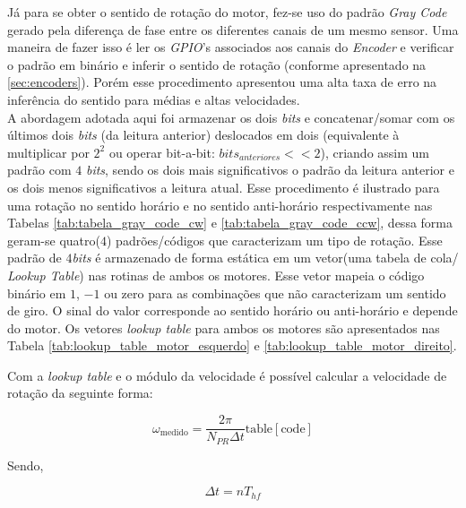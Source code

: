 Já para se obter o sentido de rotação do motor, fez-se uso do padrão \emph{Gray Code} gerado pela diferença de fase entre os diferentes canais de um mesmo sensor. Uma maneira de fazer isso é ler os \emph{GPIO}'s associados aos canais do \emph{Encoder} e verificar o padrão em binário e inferir o sentido de rotação (conforme apresentado na \autoref{sec:encoders}). Porém esse procedimento apresentou uma alta taxa de erro na inferência do sentido para médias e altas velocidades. \\

A abordagem adotada aqui foi armazenar os dois \emph{bits} e concatenar/somar com os últimos dois \emph{bits} (da leitura anterior) deslocados em dois (equivalente à multiplicar por $2^2$ ou operar bit-a-bit: $bits_{anteriores} << 2$), criando assim um padrão com $4$ \emph{bits}, sendo os dois mais significativos o padrão da leitura anterior e os dois menos significativos a leitura atual. Esse procedimento é ilustrado para uma rotação no sentido horário e no sentido anti-horário respectivamente nas Tabelas \ref{tab:tabela_gray_code_cw} e \ref{tab:tabela_gray_code_ccw}, dessa forma geram-se quatro($4$) padrões/códigos que caracterizam um tipo de rotação. Esse padrão de $4$\emph{bits} é armazenado de forma estática em um vetor(uma tabela de cola/ \emph{Lookup Table}) nas rotinas de ambos os motores. Esse vetor mapeia o código binário em $1$, $-1$ ou zero para as combinações que não caracterizam um sentido de giro. O sinal do valor corresponde ao sentido horário ou anti-horário e depende do motor. Os vetores \emph{lookup table} para ambos os motores são apresentados  nas Tabela \ref{tab:lookup_table_motor_esquerdo} e \ref{tab:lookup_table_motor_direito}.






Com a \emph{lookup table} e o módulo da velocidade é possível calcular a velocidade de rotação da seguinte forma:

\begin{equation}
    \omega_{\text{medido}} = \frac{2\pi}{N_{PR}\Delta{t}}\text{table}[\text{code}]
\end{equation}

Sendo,

\begin{equation*}
    \Delta{t} = nT_{hf}
\end{equation*}

